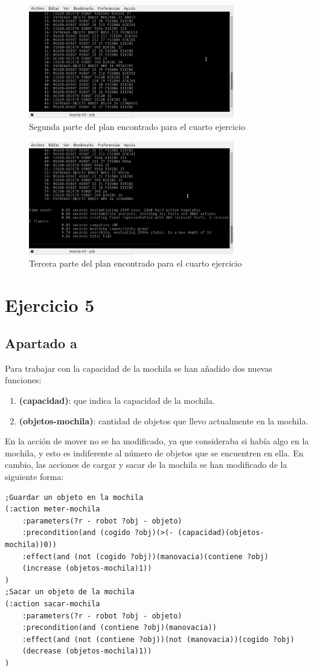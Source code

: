 \begin{figure}[H]
	\centering
	\includegraphics[width=0.8\textwidth]{img9}
	\caption{Segunda parte del plan encontrado para el cuarto ejercicio}
\end{figure}
\begin{figure}[H]
	\centering
	\includegraphics[width=0.8\textwidth]{img10}
	\caption{Tercera parte del plan encontrado para el cuarto ejercicio}
\end{figure}
\section{Ejercicio 5}
\subsection{Apartado a}
Para trabajar con la capacidad de la mochila se han añadido dos nuevas funciones:
\begin{enumerate}
	\item \textbf{(capacidad)}: que indica la capacidad de la mochila.
	\item \textbf{(objetos-mochila)}: cantidad de objetos que llevo actualmente en la mochila.
\end{enumerate}
En la acción de mover no se ha modificado, ya que consideraba si había algo en la mochila, y esto es indiferente al número de objetos que se encuentren en ella. En cambio, las acciones de cargar y sacar de la mochila se han modificado de la siguiente forma:
\begin{verbatim}
;Guardar un objeto en la mochila
(:action meter-mochila
    :parameters(?r - robot ?obj - objeto)
    :precondition(and (cogido ?obj)(>(- (capacidad)(objetos-mochila))0))
    :effect(and (not (cogido ?obj))(manovacia)(contiene ?obj)
    (increase (objetos-mochila)1))
)
;Sacar un objeto de la mochila
(:action sacar-mochila
    :parameters(?r - robot ?obj - objeto)
    :precondition(and (contiene ?obj)(manovacia))
    :effect(and (not (contiene ?obj))(not (manovacia))(cogido ?obj)
    (decrease (objetos-mochila)1))
)
\end{verbatim}
